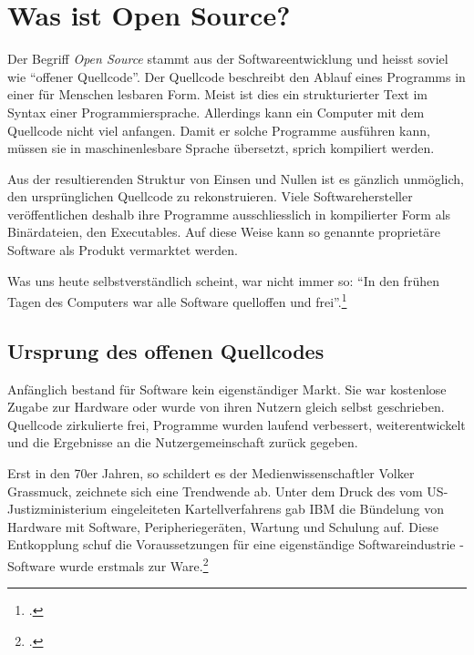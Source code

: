 \documentclass[
paper=164mm:234mm, %
pagesize, %
DIV=calc, %
10pt, %
BCOR=0mm, %
parskip=half- %
]{scrbook}
\begin{document}
\chapter*{Was ist Open Source?}

Der Begriff \emph{Open Source} stammt aus der Softwareentwicklung und heisst soviel wie \enquote{offener Quellcode}. Der Quellcode beschreibt den Ablauf eines Programms in einer für Menschen lesbaren Form. Meist ist dies ein strukturierter Text im Syntax einer Programmiersprache. Allerdings kann ein Computer mit dem Quellcode nicht viel anfangen. Damit er solche Programme ausführen kann, müssen sie in maschinenlesbare Sprache übersetzt, sprich kompiliert werden.

Aus der resultierenden Struktur von Einsen und Nullen ist es gänzlich unmöglich, den ursprünglichen Quellcode zu rekonstruieren. Viele Softwarehersteller veröffentlichen deshalb ihre Programme ausschliesslich in kompilierter Form als Binärdateien, den Executables. Auf diese Weise kann so genannte proprietäre Software als Produkt vermarktet werden.

Was uns heute selbstverständlich scheint, war nicht immer so: \enquote{In den frühen Tagen des Computers war alle Software quelloffen und frei}.\footnote{\cite[202]{Grassmuck:2004}.}


{}
\section*{Ursprung des offenen Quellcodes}

Anfänglich bestand für Software kein eigenständiger Markt. Sie war kostenlose Zugabe zur Hardware oder wurde von ihren Nutzern gleich selbst geschrieben. Quellcode zirkulierte frei, Programme wurden laufend verbessert, weiterentwickelt und die Ergebnisse an die Nutzergemeinschaft zurück gegeben.

Erst in den 70er Jahren, so schildert es der Medienwissenschaftler Volker Grassmuck, zeichnete sich eine Trendwende ab. Unter dem Druck des vom US-Justizministerium eingeleiteten Kartellverfahrens gab IBM die Bündelung von Hardware mit Software, Peripheriegeräten, Wartung und Schulung auf. Diese Entkopplung schuf die Voraussetzungen für eine eigenständige Softwareindustrie - Software wurde erstmals zur Ware.\footnote{\cite[203]{Grassmuck:2004}.}
\end{document}
